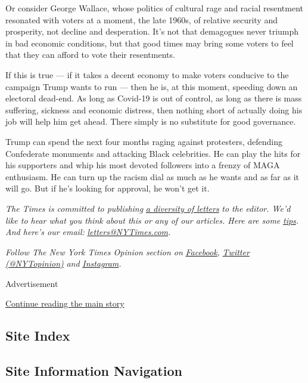 Or consider George Wallace, whose politics of cultural rage and racial
resentment resonated with voters at a moment, the late 1960s, of
relative security and prosperity, not decline and desperation. It's not
that demagogues never triumph in bad economic conditions, but that good
times may bring some voters to feel that they can afford to vote their
resentments.

If this is true --- if it takes a decent economy to make voters
conducive to the campaign Trump wants to run --- then he is, at this
moment, speeding down an electoral dead-end. As long as Covid-19 is out
of control, as long as there is mass suffering, sickness and economic
distress, then nothing short of actually doing his job will help him get
ahead. There simply is no substitute for good governance.

Trump can spend the next four months raging against protesters,
defending Confederate monuments and attacking Black celebrities. He can
play the hits for his supporters and whip his most devoted followers
into a frenzy of MAGA enthusiasm. He can turn up the racism dial as much
as he wants and as far as it will go. But if he's looking for approval,
he won't get it.

\emph{The Times is committed to publishing}
\href{https://www.nytimes3xbfgragh.onion/2019/01/31/opinion/letters/letters-to-editor-new-york-times-women.html}{\emph{a
diversity of letters}} \emph{to the editor. We'd like to hear what you
think about this or any of our articles. Here are some}
\href{https://help.nytimes3xbfgragh.onion/hc/en-us/articles/115014925288-How-to-submit-a-letter-to-the-editor}{\emph{tips}}\emph{.
And here's our email:}
\href{mailto:letters@NYTimes.com}{\emph{letters@NYTimes.com}}\emph{.}

\emph{Follow The New York Times Opinion section on}
\href{https://www.facebookcorewwwi.onion/nytopinion}{\emph{Facebook}}\emph{,}
\href{http://twitter.com/NYTOpinion}{\emph{Twitter (@NYTopinion)}}
\emph{and}
\href{https://www.instagram.com/nytopinion/}{\emph{Instagram}}\emph{.}

Advertisement

\protect\hyperlink{after-bottom}{Continue reading the main story}

\hypertarget{site-index}{%
\subsection{Site Index}\label{site-index}}

\hypertarget{site-information-navigation}{%
\subsection{Site Information
Navigation}\label{site-information-navigation}}

